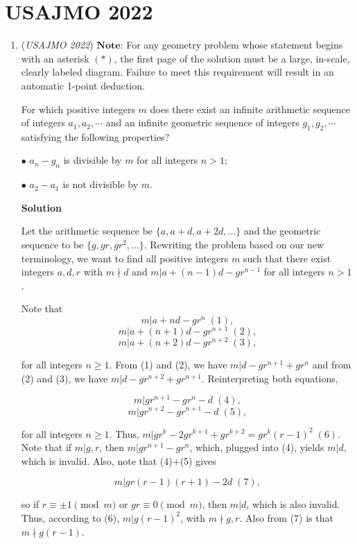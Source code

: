 \section{USAJMO 2022}
        \begin{enumerate}
        	\item (\textit{USAJMO 2022}) $\textbf{Note:}$ For any geometry problem whose statement begins with an asterisk $(*)$, the first page of the solution must be a large, in-scale, clearly labeled diagram. Failure to meet this requirement will result in an automatic 1-point deduction.


 For which positive integers $m$ does there exist an infinite arithmetic sequence of integers $a_1,a_2,\cdots$ and an infinite geometric sequence of integers $g_1,g_2,\cdots$ satisfying the following properties?


 $\bullet$ $a_n-g_n$ is divisible by $m$ for all integers $n>1$;


 $\bullet$ $a_2-a_1$ is not divisible by $m$.


 



\textbf{Solution}

Let the arithmetic sequence be $\{ a, a+d, a+2d, \dots \}$ and the geometric sequence to be $\{ g, gr, gr^2, \dots \}$. Rewriting the problem based on our new terminology, we want to find all positive integers $m$ such that there exist integers $a,d,r$ with $m \nmid d$ and $m|a+(n-1)d-gr^{n-1}$ for all integers $n>1$.

 Note that 
 \[m | a+nd-gr^n \; (1),\]
 \[m | a+(n+1)d-gr^{n+1} \; (2),\]
 \[m | a+(n+2)d-gr^{n+2} \; (3),\]

 for all integers $n\ge 1$. From (1) and (2), we have $m | d-gr^{n+1}+gr^n$ and from (2) and (3), we have $m | d-gr^{n+2}+gr^{n+1}$. Reinterpreting both equations,

 
 \[m | gr^{n+1}-gr^n-d \; (4),\]
 \[m | gr^{n+2}-gr^{n+1}-d \; (5),\]

 for all integers $n\ge 1$. Thus, $m | gr^k - 2gr^{k+1} + gr^{k+2} = gr^k(r-1)^2 \; (6)$. Note that if $m|g,r$, then $m|gr^{n+1}-gr^n$, which, plugged into (4), yields $m|d$, which is invalid. Also, note that (4)$+$(5) gives

 
 \[m | gr(r-1)(r+1) - 2d \; (7),\]

 so if $r \equiv \pm 1 \pmod m$ or $gr \equiv 0 \pmod m$, then $m|d$, which is also invalid. Thus, according to (6), $m|g(r-1)^2$, with $m \nmid g,r$. Also from (7) is that $m \nmid g(r-1)$.


\end{enumerate}
